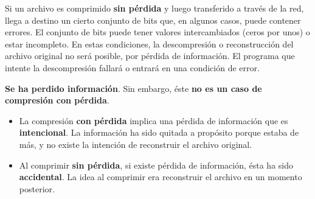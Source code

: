 \documentclass[spanish,A4,]{article}
\begin{document}
Si un archivo es comprimido \textbf{sin pérdida} y luego transferido a
través de la red, llega a destino un cierto conjunto de bits que, en
algunos casos, puede contener errores. El conjunto de bits puede tener
valores intercambiados (ceros por unos) o estar incompleto. En estas
condiciones, la descompresión o reconstrucción del archivo original no
será posible, por pérdida de información. El programa que intente la
descompresión fallará o entrará en una condición de error.

\textbf{Se ha perdido información}. Sin embargo, éste \textbf{no es un
caso de compresión con pérdida}.

\begin{itemize}
\itemsep1pt\parskip0pt
\item
  La compresión \textbf{con pérdida} implica una pérdida de información
  que es \textbf{intencional}. La información ha sido quitada a
  propósito porque estaba de más, y no existe la intención de
  reconstruir el archivo original.
\item
  Al comprimir \textbf{sin pérdida}, si existe pérdida de información,
  ésta ha sido \textbf{accidental}. La idea al comprimir era reconstruir
  el archivo en un momento posterior.
\end{itemize}
\end{document}
